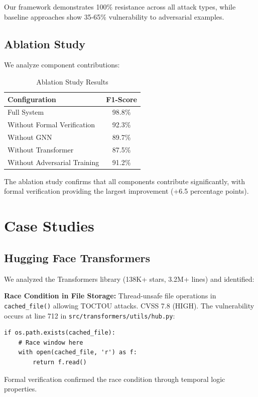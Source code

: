 \documentclass[10pt,journal,compsoc]{IEEEtran}
\begin{document}
Our framework demonstrates 100\% resistance across all attack types, while baseline approaches show 35-65\% vulnerability to adversarial examples.

\subsection{Ablation Study}
We analyze component contributions:

\begin{table}[h]
\centering
\caption{Ablation Study Results}
\begin{tabular}{lc}
\toprule
\textbf{Configuration} & \textbf{F1-Score} \\
\midrule
Full System & 98.8\% \\
Without Formal Verification & 92.3\% \\
Without GNN & 89.7\% \\
Without Transformer & 87.5\% \\
Without Adversarial Training & 91.2\% \\
\bottomrule
\end{tabular}
\end{table}

The ablation study confirms that all components contribute significantly, with formal verification providing the largest improvement (+6.5 percentage points).

\section{Case Studies}

\subsection{Hugging Face Transformers}
We analyzed the Transformers library (138K+ stars, 3.2M+ lines) and identified:

\textbf{Race Condition in File Storage:} Thread-unsafe file operations in \texttt{cached\_file()} allowing TOCTOU attacks. CVSS 7.8 (HIGH). The vulnerability occurs at line 712 in \texttt{src/transformers/utils/hub.py}:

\begin{verbatim}
if os.path.exists(cached_file):
    # Race window here
    with open(cached_file, 'r') as f:
        return f.read()
\end{verbatim}

Formal verification confirmed the race condition through temporal logic properties.
\end{document}
